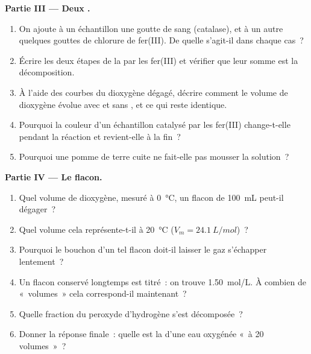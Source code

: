\begin{problem}
\medskip
\noindent\textbf{Partie III --- Deux .}
\begin{enumerate}[resume]
  \item On ajoute à un échantillon une goutte de sang (catalase), et à
        un autre quelques gouttes de chlorure de fer(III). De quelle
         s'agit-il dans chaque cas~?
  \item Écrire les deux étapes de la  par les  fer(III) et
        vérifier que leur somme est la décomposition.
  \item À l'aide des courbes du dioxygène dégagé, décrire comment le
        volume de dioxygène évolue avec et sans , et ce qui
        reste identique.
  \item Pourquoi la couleur d'un échantillon catalysé par les 
        fer(III) change-t-elle pendant la réaction et revient-elle à la
        fin~?
  \item Pourquoi une pomme de terre cuite ne fait-elle pas mousser la
        solution~?
\end{enumerate}

\medskip
\noindent\textbf{Partie IV --- Le flacon.}
\begin{enumerate}[resume]
  \item Quel volume de dioxygène, mesuré à \qty{0}{\celsius}, un flacon
        de \qty{100}{mL} peut-il dégager~?
  \item Quel volume cela représente-t-il à \qty{20}{\celsius} ($V_m =
        \qty{24.1}{L/mol}$)~?
  \item Pourquoi le bouchon d'un tel flacon doit-il laisser le gaz
        s'échapper lentement~?
  \item Un flacon conservé longtemps est titré~: on trouve
        \qty{1.50}{mol/L}. À combien de «~volumes~» cela correspond-il
        maintenant~?
  \item Quelle fraction du peroxyde d'hydrogène s'est décomposée~?
  \item Donner la réponse finale~: quelle est la 
        d'une eau oxygénée «~à 20 volumes~»~?
\end{enumerate}
\end{problem}
